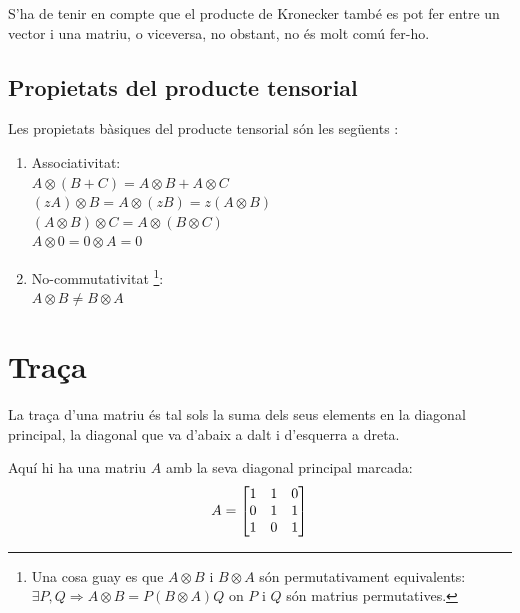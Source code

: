 S'ha de tenir en compte que el producte de Kronecker també es pot fer entre un vector i una matriu, o viceversa, no obstant, no és molt comú fer-ho.


\subsection{Propietats del producte tensorial}
Les propietats bàsiques del producte tensorial són les següents \cite{QCandQI:tensor_product, wiki:tensor_product}:
\begin{enumerate}
	\item Associativitat: \\ $A \otimes (B + C) = A \otimes B + A \otimes C$ \\
	$ (zA) \otimes B = A \otimes (zB) = z(A \otimes B)$\\
	$ (A \otimes B) \otimes C = A \otimes (B\otimes C)$ \\
	$A \otimes 0 = 0 \otimes A = 0 $
	\item No-commutativitat \footnote{Una cosa guay es que $A \otimes B$ i $B \otimes A$ són 
	permutativament equivalents: \\ $\exists P, Q \Rightarrow A \otimes B = P (  B \otimes A )Q$ on $P$ i $Q$ són matrius permutatives.  }: \\
	$A \otimes B \neq B \otimes A $
\end{enumerate}





\section{Traça}
La traça d'una matriu és tal sols la suma dels seus elements en la diagonal principal, la diagonal que va d'abaix a dalt i d'esquerra a dreta.  

Aquí hi ha una matriu $A$ amb la seva diagonal principal marcada:
$$A = 
	\begin{bmatrix}
		\tikzmarktrace{top}{1} & \tikzmarktrace{top2}{1} & 0 \\
		0 & 1 & \tikzmarktrace{bottom2}{1} \\
		\tikzmarktrace{end}{1} & 0 & \tikzmarktrace{bottom}{1}\\
	\end{bmatrix}
$$


